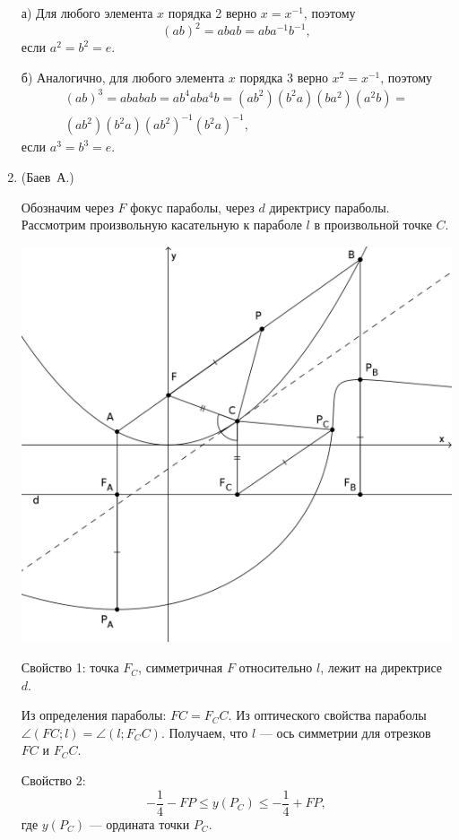 \documentclass[12pt, a4paper]{article}
\begin{document}
\begin{enumerate}
а) Для любого элемента $x$ порядка 2 верно $x=x^{-1}$, поэтому
$$
(ab)^2=abab=aba^{-1}b^{-1},
$$
если $a^2=b^2=e$.

б) Аналогично, для любого элемента $x$ порядка 3 верно $x^2=x^{-1}$, поэтому
\begin{multline*}
(ab)^3=ababab=ab^4aba^4b=(ab^2)(b^2a)(ba^2)(a^2b)=\\
(ab^2)(b^2a)(ab^2)^{-1}(b^2a)^{-1},
\end{multline*}
если $a^3=b^3=e$.

\item (Баев~А.)

Обозначим через $F$ фокус параболы,  через $d$ директрису параболы. Рассмотрим произвольную касательную к параболе $l$ в произвольной точке $C$.

\begin{center}
\includegraphics[scale=0.9]{pictures/2017-republic}
\end{center}

Свойство 1: точка $F_C$, симметричная $F$ относительно $l$, лежит на директрисе $d$. 

Из определения параболы: $FC = F_CC$. Из оптического свойства параболы $\angle(FC; l) = \angle(l; F_CC)$. Получаем, что $l$ --- ось симметрии для отрезков $FC$ и $F_CC$. 

Свойство 2: $$ -\frac{1}{4} - FP \leqslant y(P_C)  \leqslant -\frac{1}{4} + FP,$$
где $y(P_C)$ --- ордината точки $P_C$.


\end{enumerate}
\end{document}
